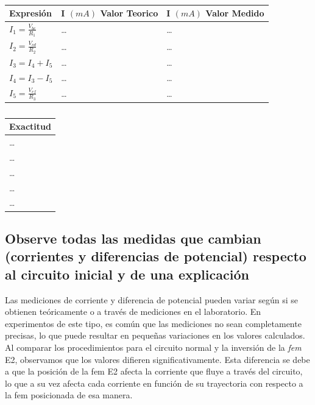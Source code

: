 \documentclass[twocolumn, 12pt]{article}
\begin{document}
\begin{table}[H]
    \captionsetup{justification=centering}
    \centering

    \begin{tabularx}{0.9\linewidth}{|>{\centering\arraybackslash}X|>{\centering\arraybackslash}X|>{\centering\arraybackslash}X|}
        \hline
        Expresión                  & I $(mA)$ Valor Teorico & I $(mA)$ Valor Medido \\\hline
        $I_1 = \frac{V_{bc}}{R_1}$ & \dots                  & \dots                 \\ \hline
        $I_2 = \frac{V_{cd}}{R_2}$ & \dots                  & \dots                 \\ \hline
        $I_3 = I_4 + I_5$          & \dots                  & \dots                 \\ \hline
        $I_4 = I_3 - I_5$          & \dots                  & \dots                 \\ \hline
        $I_5 = \frac{V_{ef}}{R_3}$ & \dots                  & \dots                 \\ \hline
    \end{tabularx}

    \vspace{.2cm}

    \begin{tabularx}{0.9\linewidth}{|>{\centering\arraybackslash}X|}
        \hline
        Exactitud \\\hline
        \dots     \\\hline
        \dots     \\\hline
        \dots     \\\hline
        \dots     \\\hline
        \dots     \\\hline
    \end{tabularx}

    \caption{}

    \label{tab:analisisDatos__12}
\end{table}

\subsection{Observe todas las medidas que cambian (corrientes y diferencias de potencial) respecto
    al circuito inicial y de una explicación}

Las mediciones de corriente y diferencia de potencial
pueden variar según si se obtienen teóricamente o a través
de mediciones en el laboratorio. En experimentos de este
tipo, es común que las mediciones no sean completamente
precisas, lo que puede resultar en pequeñas variaciones en
los valores calculados. Al comparar los procedimientos para
el circuito normal y la inversión de la \textit{fem} E2,
observamos que los valores difieren significativamente.
Esta diferencia se debe a que la posición de la fem E2
afecta la corriente que fluye a través del circuito, lo que
a su vez afecta cada corriente en función de su trayectoria
con respecto a la fem posicionada de esa manera.
\end{document}
